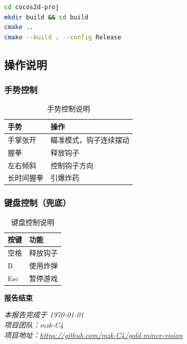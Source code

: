 \documentclass{article}
\begin{document}
\begin{lstlisting}[language=bash, caption=构建命令]
cd cocos2d-proj
mkdir build && cd build
cmake ..
cmake --build . --config Release
\end{lstlisting}

\subsection{操作说明}

\subsubsection{手势控制}

\begin{table}[H]
\centering
\begin{tabular}{|l|l|}
\hline
\textbf{手势} & \textbf{操作} \\
\hline
手掌张开 & 瞄准模式，钩子连续摆动 \\
\hline
握拳 & 释放钩子 \\
\hline
左右倾斜 & 控制钩子方向 \\
\hline
长时间握拳 & 引爆炸药 \\
\hline
\end{tabular}
\caption{手势控制说明}
\end{table}

\subsubsection{键盘控制（兜底）}

\begin{table}[H]
\centering
\begin{tabular}{|l|l|}
\hline
\textbf{按键} & \textbf{功能} \\
\hline
空格 & 释放钩子 \\
\hline
B & 使用炸弹 \\
\hline
Esc & 暂停游戏 \\
\hline
\end{tabular}
\caption{键盘控制说明}
\end{table}

\vfill
\begin{center}
\textbf{报告结束}

\vspace{1cm}
\textit{本报告完成于 \today} \\
\textit{项目团队：mzk-C4} \\
\textit{项目地址：\url{https://github.com/mzk-C4/gold-miner-vision}}
\end{center}
\end{document}

